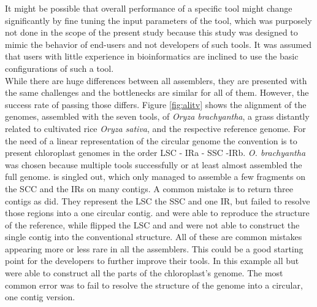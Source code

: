 It might be possible that overall performance of a specific tool might change
significantly by fine tuning the input parameters of the tool, which was purposely not
done in the scope of the present study because this study was designed to mimic the
behavior of end-users and not developers of such tools. It was assumed that
users with little experience in bioinformatics are inclined to use the basic configurations of such a tool. \\

While there are huge differences between all assemblers, they are presented with the same
challenges and the bottlenecks are similar for all of them. However, the success rate of
passing those differs. Figure \ref{fig:alitv} shows the alignment of the genomes,
assembled with the seven tools, of \textit{Oryza brachyantha}, a grass distantly related
to cultivated rice \textit{Oryza sativa}, and the respective reference genome. For the
need of a linear representation of the circular genome the convention is to present
chloroplast genomes in the order LSC - IRa - SSC -IRb. \textit{O. brachyantha} was chosen
because multiple tools successfully or at least almost assembled the full genome.  \cassp
\hspace{0.25ex} is singled out, which only managed to assemble a few fragments on the SCC
and the IRs on many contigs. A common mistake is to return three contigs as \ioga
\hspace{0.25ex} did. They represent the LSC the SSC and one IR, but failed to resolve
those regions into a one circular contig. \go \hspace{0.25ex} and \fp \hspace{0.25ex} were
able to reproduce the structure of the reference, while \ce \hspace{0.25ex} flipped the
LSC and \np \hspace{0.25ex} and \oa \hspace{0.25ex} were not able to construct the single
contig into the conventional structure. All of these are common mistakes appearing more or
less rare in all the assemblers. This could be a good starting point for the developers to
further improve their tools. In this example all but \cassp \hspace{0.25ex} were able to
construct all the parts of the chloroplast's genome. The most common error was to fail to
resolve the structure of the genome into a circular, one contig version.


